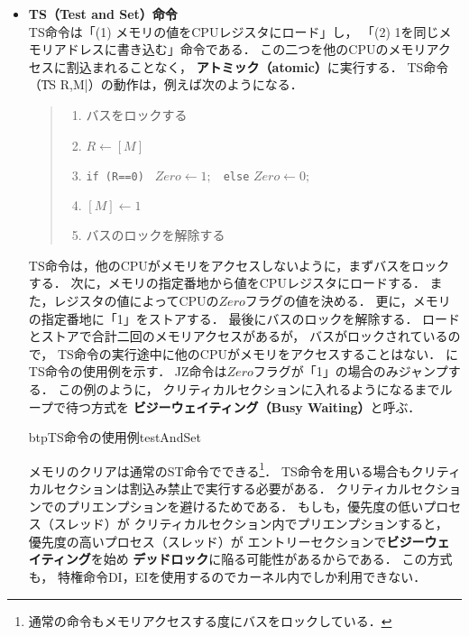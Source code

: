 \begin{itemize}
\item {\bf TS（Test and Set）命令} \\
TS命令は「(1) メモリの値をCPUレジスタにロード」し，
「(2) 1を同じメモリアドレスに書き込む」命令である．
この二つを他のCPUのメモリアクセスに割込まれることなく，
{\bf アトミック（atomic）}に実行する．
TS命令（\|TS R,M|）の動作は，例えば次のようになる．

\begin{quote}
\begin{enumerate}
\item バスをロックする
\item $R \leftarrow [M]$
\item {\tt if (R==0) } $Zero \leftarrow 1;$ {\tt ~else} $Zero \leftarrow 0;$
\item $[M] \leftarrow 1$
\item バスのロックを解除する
\end{enumerate}
\end{quote}

TS命令は，他のCPUがメモリをアクセスしないように，まずバスをロックする．
次に，メモリの指定番地から値をCPUレジスタにロードする．
また，レジスタの値によってCPUの$Zero$フラグの値を決める．
更に，メモリの指定番地に「1」をストアする．
最後にバスのロックを解除する．
ロードとストアで合計二回のメモリアクセスがあるが，
バスがロックされているので，
TS命令の実行途中に他のCPUがメモリをアクセスすることはない．
にTS命令の使用例を示す．
JZ命令は$Zero$フラグが「1」の場合のみジャンプする．
この例のように，
クリティカルセクションに入れるようになるまでループで待つ方式を
{\bf ビジーウェイティング（Busy Waiting）}と呼ぶ．

\begin{myfig}{btp}{TS命令の使用例}{testAndSet}

\end{myfig}

メモリのクリアは通常のST命令でできる\footnote{
通常の命令もメモリアクセスする度にバスをロックしている．}．
TS命令を用いる場合もクリティカルセクションは割込み禁止で実行する必要がある．
クリティカルセクションでのプリエンプションを避けるためである．
もしも，優先度の低いプロセス（スレッド）が
クリティカルセクション内でプリエンプションすると，
優先度の高いプロセス（スレッド）が
エントリーセクションで{\bf ビジーウェイティング}を始め
{\bf デッドロック}に陥る可能性があるからである．
この方式も，
特権命令DI，EIを使用するのでカーネル内でしか利用できない．


\end{itemize}

